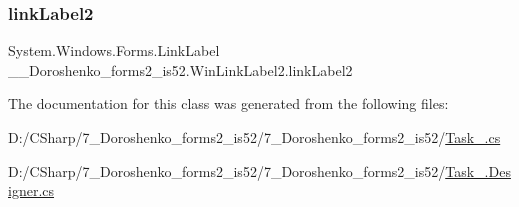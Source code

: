 \subsubsection{\texorpdfstring{link\+Label2}{linkLabel2}}
{\footnotesize\ttfamily System.\+Windows.\+Forms.\+Link\+Label \+\_\+\_\+\+Doroshenko\+\_\+forms2\+\_\+is52.\+Win\+Link\+Label2.\+link\+Label2\hspace{0.3cm}{\ttfamily [private]}}



The documentation for this class was generated from the following files\+:\begin{DoxyCompactItemize}
\item 
D\+:/\+C\+Sharp/7\+\_\+\+Doroshenko\+\_\+forms2\+\_\+is52/7\+\_\+\+Doroshenko\+\_\+forms2\+\_\+is52/\hyperlink{_task__7_8cs}{Task\+\_.\+cs}\item 
D\+:/\+C\+Sharp/7\+\_\+\+Doroshenko\+\_\+forms2\+\_\+is52/7\+\_\+\+Doroshenko\+\_\+forms2\+\_\+is52/\hyperlink{_task__7_8_designer_8cs}{Task\+\_.\+Designer.\+cs}\end{DoxyCompactItemize}
